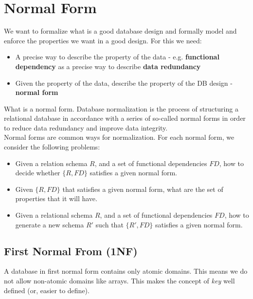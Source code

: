 \section{Normal Form}
We want to formalize what is a good database design and formally model and enforce the properties we want in a good design. For this we need:
\begin{itemize}
\item A precise way to describe the property of the data - e.g. \textbf{functional dependency} as a precise way to describe \textbf{data redundancy}
\item Given the property of the data, describe the property of the DB design - \textbf{normal form}
\end{itemize}
What is a normal form. Database normalization is the process of structuring a relational database in accordance with a series of so-called normal forms in order to reduce data redundancy and improve data integrity. \\ Normal forms are common ways for normalization. For each normal form, we consider the following problems:
\begin{itemize}
\item Given a relation schema $R$, and a set of functional dependencies $FD$, how to decide whether $\{R, FD\}$ satisfies a given normal form.
\item Given $\{R, FD\}$ that satisfies a given normal form, what are the set of properties that it will have.
\item Given a relational schema $R$, and a set of functional dependencies $FD$, how to generate a new schema $R'$ such that $\{R', FD\}$ satisfies a given normal form.
\end{itemize}

\subsection{First Normal From (1NF)}
A database in first normal form contains only atomic domains. This means we do not allow non-atomic domains like arrays. This makes the concept of \textit{key} well defined (or, easier to define).

